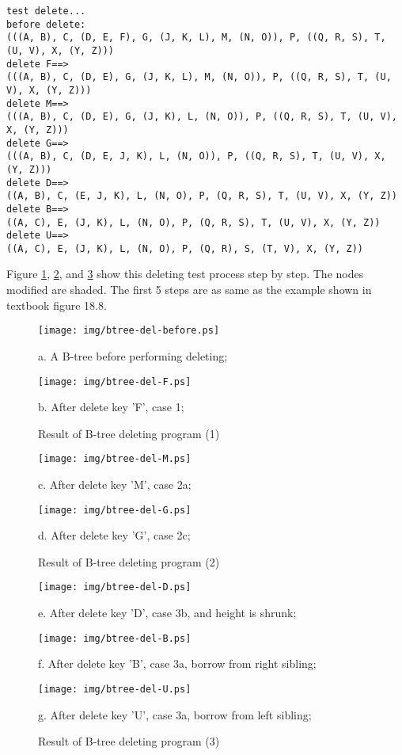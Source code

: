 \documentclass{article}
\begin{document}
\begin{verbatim}
test delete...
before delete:
(((A, B), C, (D, E, F), G, (J, K, L), M, (N, O)), P, ((Q, R, S), T, (U, V), X, (Y, Z)))
delete F==>
(((A, B), C, (D, E), G, (J, K, L), M, (N, O)), P, ((Q, R, S), T, (U, V), X, (Y, Z)))
delete M==>
(((A, B), C, (D, E), G, (J, K), L, (N, O)), P, ((Q, R, S), T, (U, V), X, (Y, Z)))
delete G==>
(((A, B), C, (D, E, J, K), L, (N, O)), P, ((Q, R, S), T, (U, V), X, (Y, Z)))
delete D==>
((A, B), C, (E, J, K), L, (N, O), P, (Q, R, S), T, (U, V), X, (Y, Z))
delete B==>
((A, C), E, (J, K), L, (N, O), P, (Q, R, S), T, (U, V), X, (Y, Z))
delete U==>
((A, C), E, (J, K), L, (N, O), P, (Q, R), S, (T, V), X, (Y, Z))
\end{verbatim}

Figure \ref{fig:result-del1}, \ref{fig:result-del2}, and \ref{fig:result-del3}
show this deleting test process step by step. The nodes modified are shaded.
The first 5 steps are as same as the example shown in textbook\cite{CLRS} figure 18.8.

\begin{figure}[htbp]
    \begin{center}
      \texttt{[image: img/btree-del-before.ps]}

      a. A B-tree before performing deleting;

      \texttt{[image: img/btree-del-F.ps]}

      b. After delete key 'F', case 1; 
      \caption{Result of B-tree deleting program (1)} \label{fig:result-del1}
    \end{center}
\end{figure}

\begin{figure}[htbp]
    \begin{center}
      \texttt{[image: img/btree-del-M.ps]}

      c. After delete key 'M', case 2a;

      \texttt{[image: img/btree-del-G.ps]}

      d. After delete key 'G', case 2c; 
      \caption{Result of B-tree deleting program (2)} \label{fig:result-del2}
    \end{center}
\end{figure}

\begin{figure}[htbp]
    \begin{center}
      \texttt{[image: img/btree-del-D.ps]}

      e. After delete key 'D', case 3b, and height is shrunk;

      \texttt{[image: img/btree-del-B.ps]}

      f. After delete key 'B', case 3a, borrow from right sibling; 

      \texttt{[image: img/btree-del-U.ps]}

      g. After delete key 'U', case 3a, borrow from left sibling; 

      \caption{Result of B-tree deleting program (3)} \label{fig:result-del3}
    \end{center}
\end{figure}
\end{document}
